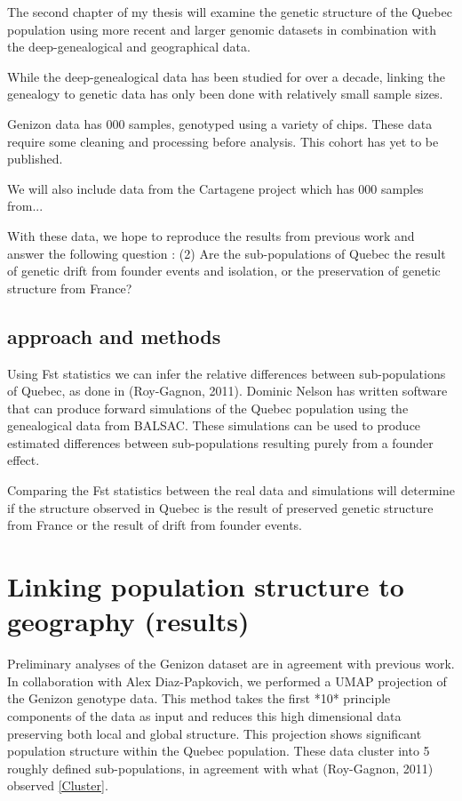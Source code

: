 \documentclass[
11pt, %
oneside, %
english, %
doublespacing, %
headsepline, %
]{MastersDoctoralThesis} %
\begin{document}
The second chapter of my thesis will examine the genetic structure of the Quebec population using more recent and larger genomic datasets in combination with the deep-genealogical and geographical data.

While the deep-genealogical data has been studied for over a decade, linking the genealogy to genetic data has only been done with relatively small sample sizes. 

Genizon data has 000 samples, genotyped using a variety of chips. These data require some cleaning and processing before analysis. This cohort has yet to be published. 

We will also include data from the Cartagene project which has 000 samples from...

With these data, we hope to reproduce the results from previous work and answer the following question :
(2) Are the sub-populations of Quebec the result of genetic drift from founder events and isolation, or the preservation of genetic structure from France?

\subsection{approach and methods}
Using Fst statistics we can infer the relative differences between sub-populations of Quebec, as done in (Roy-Gagnon, 2011).
Dominic Nelson has written software that can produce forward simulations of the Quebec population using the genealogical data from BALSAC.
These simulations can be used to produce estimated differences between sub-populations resulting purely from a founder effect.

Comparing the Fst statistics between the real data and simulations will determine if the structure observed in Quebec is the result of preserved genetic structure from France or the result of drift from founder events.

\section{Linking population structure to geography (results)}
Preliminary analyses of the Genizon dataset are in agreement with previous work.
In collaboration with Alex Diaz-Papkovich, we performed a UMAP projection of the Genizon genotype data.
This method takes the first *10* principle components of the data as input and reduces this high dimensional data preserving both local and global structure.
This projection shows significant population structure within the Quebec population. 
These data cluster into 5 roughly defined sub-populations, in agreement with what (Roy-Gagnon, 2011) observed \ref{Cluster}. 
\end{document}

